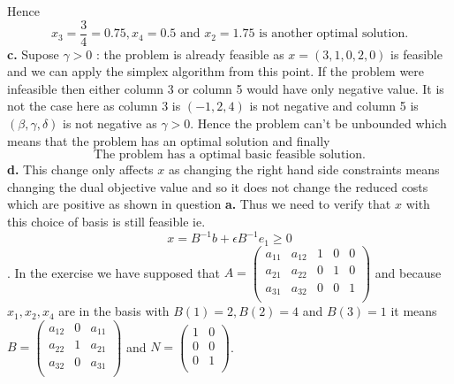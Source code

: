 \documentclass{article}
\begin{document}
Hence $$\boxed{x_3 = \frac{3}{4} = 0.75, x_4 = 0.5\text{ and } x_2 = 1.75 \text{ is another optimal solution.}}$$
\textbf{c.} Supose $\gamma>0$ : the problem is already feasible as $x = (3,1,0,2,0)$ is feasible and we can apply the simplex algorithm from this point. 
If the problem were infeasible then either column 3 or column 5 would have only negative value. It is not the case here as column 3 is $(-1,2,4)$ is not negative and column 5 is $(\beta,\gamma,\delta)$ is not negative as $\gamma>0$. Hence the problem can't be unbounded which means that the problem has an optimal solution and finally $$\boxed{\text{The problem has a optimal basic feasible solution.}}$$
\textbf{d.} This change only affects $x$ as changing the right hand side constraints means changing the dual objective value and so it does not change the reduced costs which are positive as shown in question \textbf{a.}
Thus we need to verify that $x$ with this choice of basis is still feasible ie. \begin{equation} x = B^{-1}b+\epsilon B^{-1}e_1\ge 0\end{equation}.
In the exercise we have supposed that $A = \left(\begin{array}{ccccc}
    a_{11} & a_{12}& 1 & 0 & 0\\
    a_{21} & a_{22}& 0 & 1 & 0\\
    a_{31} & a_{32}& 0 & 0 & 1\\
\end{array}\right)$ and because $x_1,x_2,x_4$ are in the basis with $B(1) = 2, B(2) = 4$ and $B(3) = 1$ it means $B = \left(\begin{array}{ccc}
    a_{12}& 0&a_{11}\\
    a_{22}& 1&a_{21}\\
    a_{32}& 0&a_{31}\\
\end{array}\right)$ and $N = \left(\begin{array}{cc}
    1&0\\
    0&0\\
    0&1\\
\end{array}\right)$. 
\end{document}
